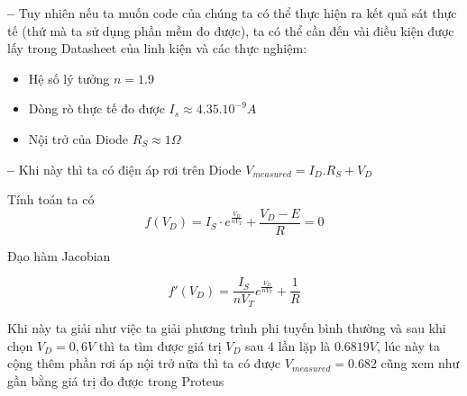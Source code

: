 \noindent \textbf{--} Tuy nhiên nếu ta muốn code của chúng ta có thể thực hiện ra kết quả sát thực tế (thứ mà ta sử dụng phần mềm đo được), ta có thể cần đến vài điều kiện được lấy trong Datasheet của linh kiện và các thực nghiệm:

\begin{itemize}
    \item Hệ số lý tưởng $n=1.9$ 
    \item Dòng rò thực tế đo được $I_s\approx 4.35.10^{-9} A$
    \item Nội trở của Diode $R_S\approx 1 \Omega $ 
\end{itemize}

\noindent \textbf{--} Khi này thì ta có điện áp rơi trên Diode $V_{measured} = I_D.R_S + V_D$

Tính toán ta có 
\begin{equation}
    f(V_D) =  I_S \cdot e^{\frac{V_D}{n V_T}} + \frac{V_D - E}{R} = 0
\end{equation}

Đạo hàm Jacobian 

\begin{equation}
    f'(V_D) = \frac{I_S}{n V_T} e^{\frac{V_D}{n V_T}} + \frac{1}{R}
\end{equation}

Khi này ta giải như việc ta giải phương trình phi tuyến bình thường và sau khi chọn $V_D = 0,6 V$ thì ta tìm được giá trị $V_D$ sau 4 lần lặp là $0.6819V$, lúc này ta cộng thêm phần rơi áp nội trở nữa thì ta có được $V_{measured} = 0.682$ cũng xem như gần bằng giá trị đo được trong Proteus 

